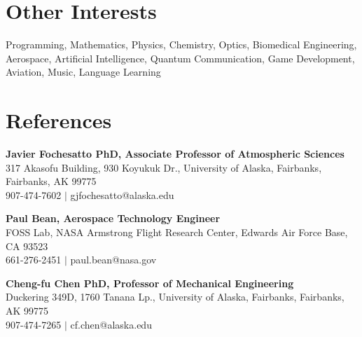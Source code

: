 \documentclass[12pt,a4paper]{article}
\begin{document}
\section*{Other Interests}

Programming, Mathematics, Physics, Chemistry, Optics, Biomedical Engineering, Aerospace,
Artificial Intelligence, Quantum Communication, Game Development, Aviation, Music, Language
Learning

\section*{References}

\textbf{Javier Fochesatto PhD, Associate Professor of Atmospheric Sciences}\\
317 Akasofu Building, 930 Koyukuk Dr., University of Alaska, Fairbanks, Fairbanks, AK 99775\\
907-474-7602 $|$ gjfochesatto@alaska.edu

\textbf{Paul Bean, Aerospace Technology Engineer}\\
FOSS Lab, NASA Armstrong Flight Research Center, Edwards Air Force Base, CA 93523\\
661-276-2451 $|$ paul.bean@nasa.gov

\textbf{Cheng-fu Chen PhD, Professor of Mechanical Engineering}\\
Duckering 349D, 1760 Tanana Lp., University of Alaska, Fairbanks, Fairbanks, AK 99775\\
907-474-7265 $|$ cf.chen@alaska.edu
\end{document}
